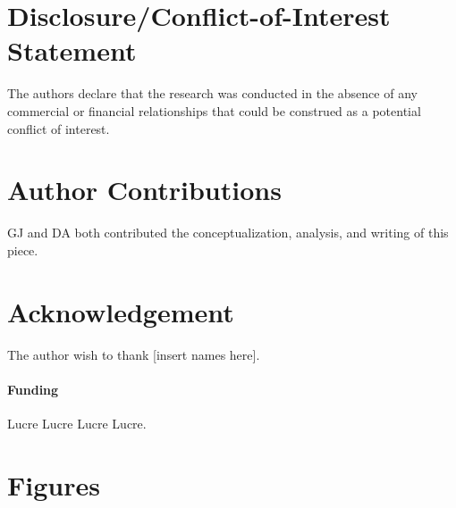 \documentclass{frontiersSCNS} %
\begin{document}
\section*{Disclosure/Conflict-of-Interest Statement}

The authors declare that the research was conducted in the absence of any commercial or financial relationships that could be construed as a potential conflict of interest.

\section*{Author Contributions}

GJ and DA both contributed the conceptualization, analysis, and writing of this piece.

\section*{Acknowledgement}
The author wish to thank [insert names here].

\paragraph{Funding\textcolon} Lucre Lucre Lucre Lucre.




\section*{Figures}

\end{document}
